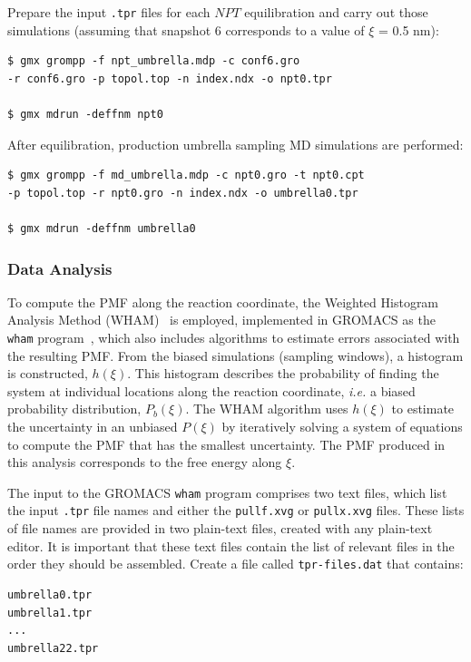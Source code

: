 \documentclass[9pt,tutorial]{livecoms}
\begin{document}
Prepare the input \texttt{.tpr} files for each $NPT$ equilibration and carry out those simulations (assuming that snapshot 6 corresponds to a value of $\xi$ = 0.5 nm):

\begin{verbatim}
$ gmx grompp -f npt_umbrella.mdp -c conf6.gro 
-r conf6.gro -p topol.top -n index.ndx -o npt0.tpr

$ gmx mdrun -deffnm npt0
\end{verbatim}

After equilibration, production umbrella sampling MD simulations are performed:

\begin{verbatim}
$ gmx grompp -f md_umbrella.mdp -c npt0.gro -t npt0.cpt 
-p topol.top -r npt0.gro -n index.ndx -o umbrella0.tpr

$ gmx mdrun -deffnm umbrella0
\end{verbatim}

\subsubsection{Data Analysis} \label{umbrella_analysis}

To compute the PMF along the reaction coordinate, the Weighted Histogram Analysis Method (WHAM)~\cite{Kumar1992} is employed, implemented in GROMACS as the \texttt{wham} program~\cite{Hub2010}, which also includes algorithms to estimate errors associated with the resulting PMF. From the biased simulations (sampling windows), a histogram is constructed, $h(\xi)$. This histogram describes the probability of finding the system at individual locations along the reaction coordinate, {\em i.e.} a biased probability distribution, $P_b(\xi)$. The WHAM algorithm uses $h(\xi)$ to estimate the uncertainty in an unbiased $P(\xi)$ by iteratively solving a system of equations to compute the PMF that has the smallest uncertainty. The PMF produced in this analysis corresponds to the free energy along $\xi$.

The input to the GROMACS \texttt{wham} program comprises two text files, which list the input \texttt{.tpr} file names and either the \texttt{pullf.xvg} or \texttt{pullx.xvg} files. These lists of file names are provided in two plain-text files, created with any plain-text editor. It is important that these text files contain the list of relevant files in the order they should be assembled. Create a file called \texttt{tpr-files.dat} that contains:

\begin{verbatim}
umbrella0.tpr
umbrella1.tpr
...
umbrella22.tpr
\end{verbatim}
\end{document}
